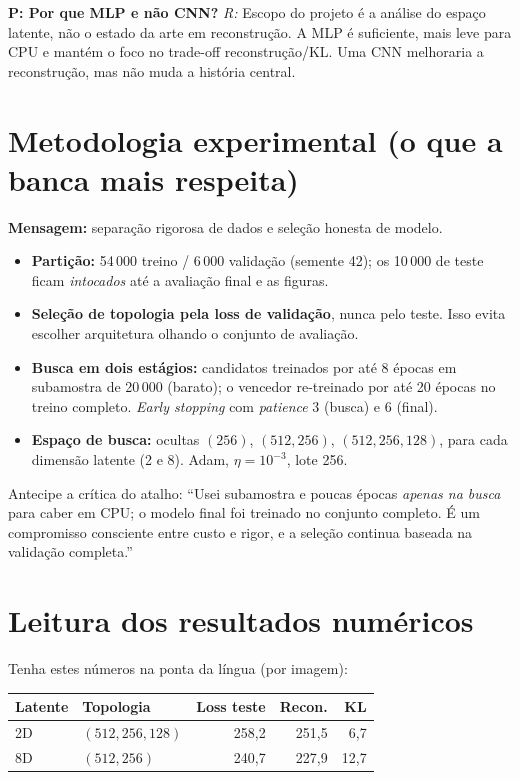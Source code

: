 \documentclass[11pt,a4paper]{article}
\newcommand{\Q}[1]{\textbf{P: #1}}
\newcommand{\A}[1]{\textit{R:} #1}
\begin{document}
\begin{pergunta}
\Q{Por que MLP e não CNN?} \A{Escopo do projeto é a análise do espaço latente,
não o estado da arte em reconstrução. A MLP é suficiente, mais leve para CPU e
mantém o foco no trade-off reconstrução/KL. Uma CNN melhoraria a reconstrução,
mas não muda a história central.}
\end{pergunta}

\section{Metodologia experimental (o que a banca mais respeita)}

\textbf{Mensagem:} separação rigorosa de dados e seleção honesta de modelo.

\begin{itemize}[leftmargin=1.2em, itemsep=0.1em]
\item \textbf{Partição:} 54\,000 treino / 6\,000 validação (semente 42); os
10\,000 de teste ficam \emph{intocados} até a avaliação final e as figuras.
\item \textbf{Seleção de topologia pela loss de validação}, nunca pelo teste.
Isso evita escolher arquitetura olhando o conjunto de avaliação.
\item \textbf{Busca em dois estágios:} candidatos treinados por até 8 épocas em
subamostra de 20\,000 (barato); o vencedor re-treinado por até 20 épocas no
treino completo. \textit{Early stopping} com \textit{patience} 3 (busca) e 6
(final).
\item \textbf{Espaço de busca:} ocultas $(256)$, $(512,256)$, $(512,256,128)$,
para cada dimensão latente (2 e 8). Adam, $\eta=10^{-3}$, lote 256.
\end{itemize}

\begin{dica}
Antecipe a crítica do atalho: ``Usei subamostra e poucas épocas \emph{apenas na
busca} para caber em CPU; o modelo final foi treinado no conjunto completo. É um
compromisso consciente entre custo e rigor, e a seleção continua baseada na
validação completa.''
\end{dica}

\section{Leitura dos resultados numéricos}

Tenha estes números na ponta da língua (por imagem):

\begin{table}[H]
\centering\small
\begin{tabular}{llrrr}
\toprule
\textbf{Latente} & \textbf{Topologia} & \textbf{Loss teste} &
\textbf{Recon.} & \textbf{KL} \\
\midrule
2D & $(512,256,128)$ & 258,2 & 251,5 & 6,7 \\
8D & $(512,256)$     & 240,7 & 227,9 & 12,7 \\
\bottomrule
\end{tabular}
\end{table}
\end{document}
